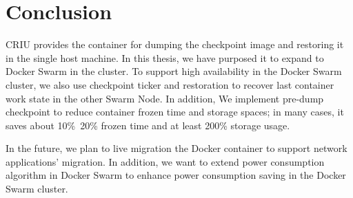 \chapter{Conclusion}
\label{chap:conclusion}
CRIU provides the container for dumping the checkpoint image and restoring it in the single host machine. In this thesis, we have purposed it to expand to Docker Swarm in the cluster.
To support high availability in the Docker Swarm cluster, we also use checkpoint ticker and restoration to recover last container work state in the other Swarm Node. In addition, We implement pre-dump checkpoint to reduce container frozen time and storage spaces; in many cases, it saves about 10\%~20\% frozen time and at least 200\% storage usage.

In the future, we plan to live migration the Docker container to support network applications' migration. In addition, we want to extend power consumption algorithm in Docker Swarm to enhance power consumption saving in the Docker Swarm cluster.